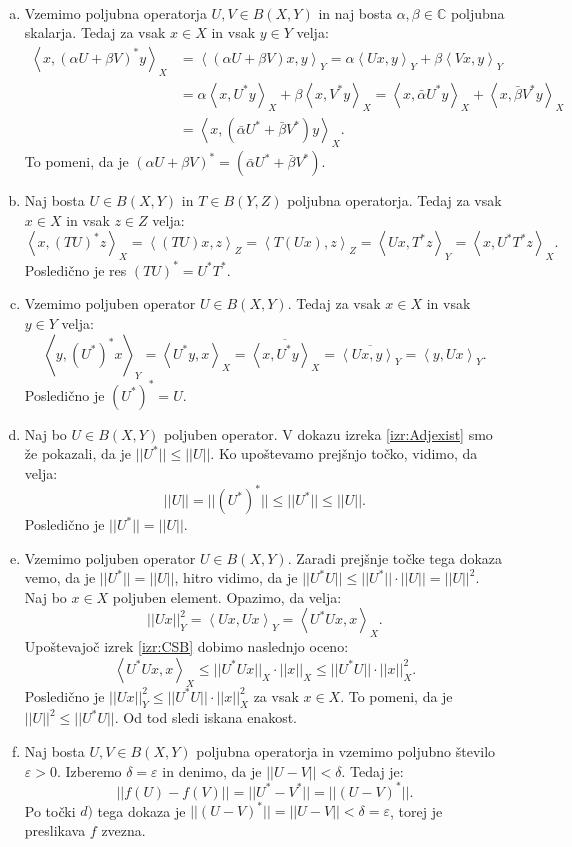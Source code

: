 \documentclass[12pt,a4paper,oneside,fleqn,openany]{book}
\newcommand{\eopf}{\raisebox{0.8ex}{\framebox{}}} %
\newenvironment{dokaz}%
{\noindent{\bf Dokaz.}\ }%
{\hfill\eopf\par\bigskip}%
\newcommand{\C}{\mathbb{C}}
\newcommand{\abs}[1]{\ensuremath{\lvert #1 \rvert}}
\newcommand{\norm}[1]{\abs{\abs{#1}}}
\newcommand{\Sp}[2]{\ensuremath{\left<#1, #2\right>}}
\begin{document}
\begin{dokaz}
	\begin{enumerate}[a)]
		\item Vzemimo poljubna operatorja $U, V \in B(X, Y)$ in naj bosta $\alpha, \beta \in \C$ poljubna skalarja. Tedaj za vsak $x\in X$ in vsak $y\in Y$ velja: \begin{align*}
			\Sp{x}{(\alpha U + \beta V)^*y}_X &= \Sp{(\alpha U + \beta V)x}{y}_Y
			= \alpha \Sp{Ux}{y}_Y + \beta \Sp{Vx}{y}_Y \\
			&= \alpha \Sp{x}{U^*y}_X + \beta\Sp{x}{V^*y}_X
			= \Sp{x}{\bar{\alpha}U^*y}_X + \Sp{x}{\bar{\beta}V^*y}_X \\
			&= \Sp{x}{(\bar{\alpha} U^* + \bar{\beta} V^*)y}_X.
		\end{align*} 
		To pomeni, da je $(\alpha U + \beta V)^* = (\bar{\alpha} U^* + \bar{\beta} V^*)$.
		
		\item Naj bosta $U\in B(X, Y)$ in $T\in B(Y, Z)$ poljubna operatorja. Tedaj za vsak $x\in X$ in vsak $z\in Z$ velja: $$\Sp{x}{(TU)^*z}_X = \Sp{(TU)x}{z}_Z = \Sp{T(Ux)}{z}_Z = \Sp{Ux}{T^*z}_Y = \Sp{x}{U^*T^*z}_X.$$
		Posledično je res $(TU)^* = U^*T^*$.
		
		\item Vzemimo poljuben operator $U\in B(X, Y)$. Tedaj za vsak $x\in X$ in vsak $y\in Y$ velja: $$\Sp{y}{(U^*)^*x}_Y = \Sp{U^*y}{x}_X = \overline{\Sp{x}{U^*y}_X} = \overline{\Sp{Ux}{y}_Y} = \Sp{y}{Ux}_Y.$$
		Posledično je $(U^*)^* = U$.
		
		\item Naj bo $U\in B(X, Y)$ poljuben operator. V dokazu izreka \ref{izr:Adjexist} smo že pokazali, da je $\norm{U^*} \leq \norm{U}$. Ko upoštevamo prejšnjo točko, vidimo, da velja: $$\norm{U} = \norm{(U^*)^*} \leq \norm{U^*} \leq \norm{U}.$$
		Posledično je $\norm{U^*} = \norm{U}$.
		
		\item Vzemimo poljuben operator $U\in B(X, Y)$. Zaradi prejšnje točke tega dokaza vemo, da je $\norm{U^*} = \norm{U}$, hitro vidimo, da je $\norm{U^*U}\leq\norm{U^*}\cdot\norm{U} = \norm{U}^2$.
		Naj bo $x\in X$ poljuben element. Opazimo, da velja: $$\norm{Ux}_Y^2 = \Sp{Ux}{Ux}_Y = \Sp{U^*Ux}{x}_X.$$ Upoštevajoč izrek \ref{izr:CSB} dobimo naslednjo oceno: $$\Sp{U^*Ux}{x}_X \leq \norm{U^*Ux}_X\cdot\norm{x}_X \leq \norm{U^*U}\cdot\norm{x}_X^2.$$ Posledično je $\norm{Ux}_Y^2 \leq \norm{U^*U}\cdot\norm{x}_X^2$ za vsak $x\in X$. To pomeni, da je $\norm{U}^2 \leq \norm{U^* U}$. Od tod sledi iskana enakost.
		
		\item Naj bosta $U, V \in B(X, Y)$ poljubna operatorja in vzemimo poljubno število $\varepsilon > 0$. Izberemo $\delta = \varepsilon$ in denimo, da je $\norm{U - V} < \delta$. Tedaj je: $$\norm{f(U) - f(V)} = \norm{U^* - V^*} = \norm{(U - V)^*}.$$ Po točki $d)$ tega dokaza je $\norm{(U-V)^*} = \norm{U - V} < \delta = \varepsilon$, torej je preslikava $f$ zvezna.
	\end{enumerate}
\end{dokaz}
\end{document}
